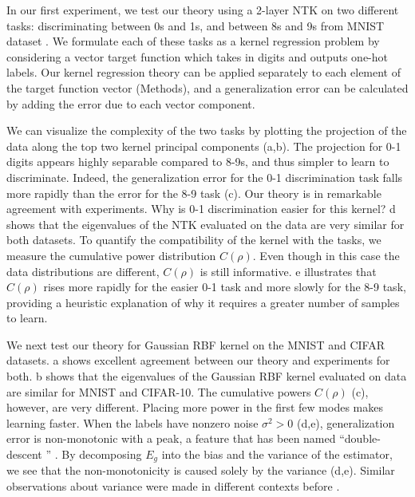 \documentclass[11pt]{article}
\begin{document}
In our first experiment, we test our theory using a 2-layer NTK \cite{cho2009kernel,jacot2018neural} on two different tasks: discriminating between 0s and 1s, and between 8s and 9s from MNIST dataset \cite{MNIST}. We formulate each of these tasks as a kernel regression problem by considering a vector target function which takes in digits and outputs one-hot labels. Our kernel regression theory can be applied separately to each element of the target function vector (Methods), and a generalization error can be calculated by adding the error due to each vector component.

We can visualize the complexity of the two tasks by plotting the projection of the data along the top two kernel principal components (a,b). The projection for 0-1 digits appears highly separable compared to 8-9s, and thus simpler to learn to discriminate. %
Indeed, the generalization error for the 0-1 discrimination task falls more rapidly than the error for the 8-9 task (c). Our theory is in remarkable agreement with experiments. Why is 0-1 discrimination easier for this kernel? d shows that the eigenvalues of the NTK evaluated on the data are very similar for both datasets. To quantify the compatibility of the kernel with the tasks, we measure the cumulative power distribution $C(\rho)$. Even though in this case the data distributions are different, $C(\rho)$ is still informative. e illustrates that $C(\rho)$ rises more rapidly for the easier 0-1 task and more slowly for the 8-9 task, providing a heuristic explanation of why it requires a greater number of samples to learn.  

We next test our theory for Gaussian RBF kernel on the MNIST \cite{MNIST} and CIFAR \cite{CIFAR} datasets. a shows excellent agreement between our theory and experiments for both. b shows that the eigenvalues of the Gaussian RBF kernel evaluated on data are similar for MNIST and CIFAR-10. The cumulative powers $C(\rho)$ (c), however, are very different. Placing more power in the first few modes makes learning faster. When the labels have nonzero noise $\sigma^2>0$ (d,e), generalization error is non-monotonic with a peak, a feature that has been named ``double-descent%
'' \cite{belkin2019reconciling,loog2020brief}. By decomposing $E_g$ into the bias and the variance of the estimator, we see that the non-monotonicity is caused solely by the variance (d,e). Similar observations about variance were made in different contexts before \cite{montanari2019generalization, dascoli2020double,nakkiran2020optimal}.
\end{document}
